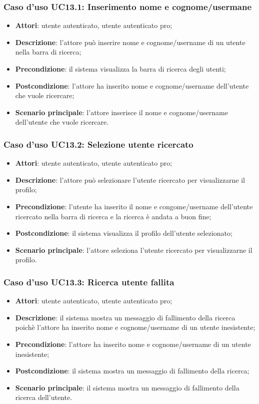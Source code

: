 \subsubsection{Caso d'uso UC13.1: Inserimento nome e cognome/usermane}

\begin{itemize}
	\item \textbf{Attori}: utente autenticato, utente autenticato pro;
	\item \textbf{Descrizione}: l'attore può inserire nome e cognome/username di un utente nella barra di ricerca;
	\item \textbf{Precondizione}: il sistema visualizza la barra di ricerca degli utenti;
	\item \textbf{Postcondizione}: l'attore ha inserito nome e cognome/username dell'utente che vuole ricercare;
	\item \textbf{Scenario principale}: l'attore inserisce il nome e cognome/username dell'utente che vuole ricercare.
\end{itemize}

\subsubsection{Caso d'uso UC13.2: Selezione utente ricercato}

\begin{itemize}
	\item \textbf{Attori}: utente autenticato, utente autenticato pro;
	\item \textbf{Descrizione}: l'attore può selezionare l'utente ricercato per visualizzarne il profilo;
	\item \textbf{Precondizione}: l'utente ha inserito il nome e congome/username dell'utente ricercato nella barra di ricerca e la ricerca è andata a buon fine;
	\item \textbf{Postcondizione}: il sistema visualizza il profilo dell'utente selezionato;
	\item \textbf{Scenario principale}: l'attore seleziona l'utente ricercato per visualizzarne il profilo.
\end{itemize}

\subsubsection{Caso d'uso UC13.3: Ricerca utente fallita}

\begin{itemize}
	\item \textbf{Attori}: utente autenticato, utente autenticato pro;
	\item \textbf{Descrizione}: il sistema mostra un messaggio di fallimento della ricerca poichè l'attore ha inserito nome e cognome/username di un utente inesistente;
	\item \textbf{Precondizione}: l'attore ha inserito nome e cognome/username di un utente inesistente;
	\item \textbf{Postcondizione}: il sistema mostra un messaggio di fallimento della ricerca;
	\item \textbf{Scenario principale}: il sistema mostra un messaggio di fallimento della ricerca dell'utente.
\end{itemize}